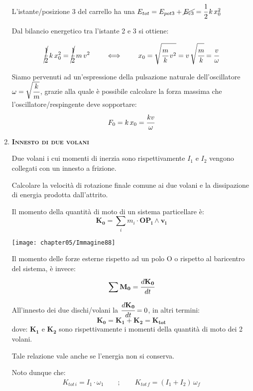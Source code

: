 \begin{enumerate}
	L'istante/posizione 3 del carrello ha una $E_{tot} = E_{pot3} + \cancel{E_{c3}} = \cfrac{1}{2}\,k\,x_0^2$
	
	Dal bilancio energetico tra l'istante 2 e 3 si ottiene:
	
	\begin{gather*}
	\cancel{\cfrac{1}{2}}\,k\,x_0^2 = \cancel{\cfrac{1}{2}}\,m\,v^2\qquad\iff\qquad x_0 = \sqrt{\cfrac{m}{k}\,v^2} = v\,\sqrt{\cfrac{m}{k}} = \cfrac{v}{\omega}
	\end{gather*}
	
	Siamo pervenuti ad un'espressione della pulsazione naturale dell'oscillatore $\omega = \sqrt{\cfrac{k}{m}}$, grazie alla quale è possibile calcolare la forza massima che l'oscillatore/respingente deve sopportare:
	\[
	F_0 = k\,x_0 = \cfrac{kv}{\omega}
	\]

\newpage
	\item {\scshape{\bfseries Innesto di due volani}}
	
	\begin{minipage}{.5\textwidth}
	Due volani i cui momenti di inerzia sono rispettivamente $I_1$ e $I_2$ vengono collegati con un innesto a frizione.
	
	Calcolare la velocità di rotazione finale comune ai due volani e la dissipazione di energia prodotta dall'attrito.
	
	Il momento della quantità di moto di un sistema particellare è:
	\[\mathbf{K_0} = \sum_i{m_i}\cdot \mathbf{OP_i}\wedge\mathbf{v_i}\]
	\end{minipage}
	\hfill
	\begin{minipage}{.5\textwidth}
	\centering
	\texttt{[image: chapter05/Immagine88]}
	\end{minipage}
	
		Il momento delle forze esterne rispetto ad un polo O o rispetto al baricentro del sistema, è invece:
	\[\sum{\mathbf{M_0}} = \cfrac{d\mathbf{K_0}}{dt}\]
	
	All'innesto dei due dischi/volani la $\cfrac{d\mathbf{K_0}}{dt} = 0$, in altri termini:
	\[\mathbf{K_0} = \mathbf{K_1}+\mathbf{K_2} = \mathbf{K_{tot}}\]
	dove: $\mathbf{K_1}$ e $\mathbf{K_2}$ sono rispettivamente i momenti della quantità di moto dei 2 volani.
	
	Tale relazione vale anche se l'energia non si conserva.
	
	Noto dunque che:
	\begin{gather*}
	K_{tot\,i} = I_1 \cdot \omega_1\qquad;\qquad K_{tot\,f} = (I_1 + I_2)\,\omega_f
	\end{gather*}
	

\end{enumerate}
